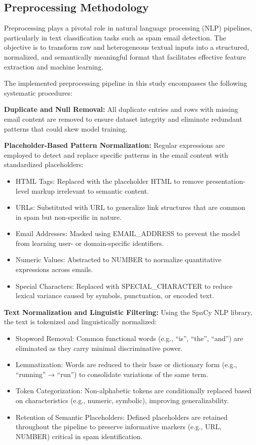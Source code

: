 \subsection{Preprocessing Methodology}
\label{subsec:preprocessing-methodology}
Preprocessing plays a pivotal role in natural language processing (NLP) pipelines, particularly in text classification tasks such as spam email detection.
The objective is to transform raw and heterogeneous textual inputs into a structured, normalized, and semantically meaningful format that facilitates effective feature extraction and machine learning.

The implemented preprocessing pipeline in this study encompasses the following systematic procedures:

\textbf{Duplicate and Null Removal:} All duplicate entries and rows with missing email content are removed to ensure dataset integrity and eliminate redundant patterns that could skew model training.

\textbf{Placeholder-Based Pattern Normalization:} Regular expressions are employed to detect and replace specific patterns in the email content with standardized placeholders:
\begin{itemize}
    \item HTML Tags: Replaced with the placeholder HTML to remove presentation-level markup irrelevant to semantic content.
    \item URLs: Substituted with URL to generalize link structures that are common in spam but non-specific in nature.
    \item Email Addresses: Masked using EMAIL\_ADDRESS to prevent the model from learning user- or domain-specific identifiers.
    \item Numeric Values: Abstracted to NUMBER to normalize quantitative expressions across emails.
    \item Special Characters: Replaced with SPECIAL\_CHARACTER to reduce lexical variance caused by symbols, punctuation, or encoded text.
\end{itemize}

\textbf{Text Normalization and Linguistic Filtering:} Using the SpaCy NLP library, the text is tokenized and linguistically normalized:
\begin{itemize}
    \item Stopword Removal: Common functional words (e.g., ``is'', ``the'', ``and'') are eliminated as they carry minimal discriminative power.
    \item Lemmatization: Words are reduced to their base or dictionary form (e.g., ``running'' → ``run'') to consolidate variations of the same term.
    \item Token Categorization: Non-alphabetic tokens are conditionally replaced based on characteristics (e.g., numeric, symbolic), improving generalizability.
    \item Retention of Semantic Placeholders: Defined placeholders are retained throughout the pipeline to preserve informative markers (e.g., URL, NUMBER) critical in spam identification.
\end{itemize}


